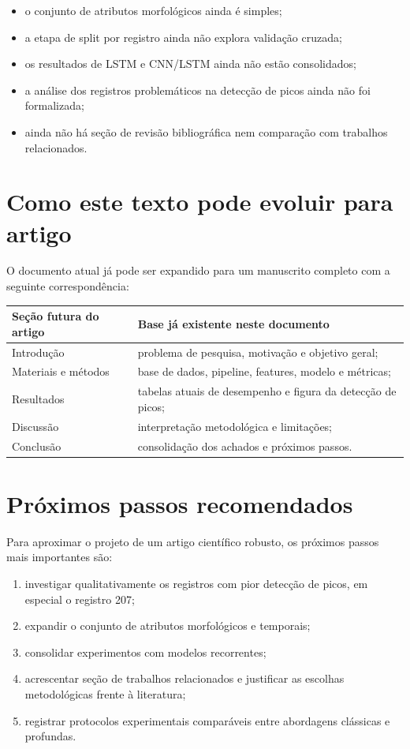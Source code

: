 \documentclass[12pt,a4paper]{article}
\begin{document}
\begin{itemize}
    \item o conjunto de atributos morfol\'ogicos ainda \'e simples;
    \item a etapa de split por registro ainda n\~ao explora valida\c{c}\~ao cruzada;
    \item os resultados de LSTM e CNN/LSTM ainda n\~ao est\~ao consolidados;
    \item a an\'alise dos registros problem\'aticos na detec\c{c}\~ao de picos ainda n\~ao foi formalizada;
    \item ainda n\~ao h\'a se\c{c}\~ao de revis\~ao bibliogr\'afica nem compara\c{c}\~ao com trabalhos relacionados.
\end{itemize}

\section{Como este texto pode evoluir para artigo}
O documento atual j\'a pode ser expandido para um manuscrito completo com a seguinte correspond\^encia:

\begin{longtable}{p{} p{}}
\toprule
\textbf{Se\c{c}\~ao futura do artigo} & \textbf{Base j\'a existente neste documento} \\
\midrule
Introdu\c{c}\~ao & problema de pesquisa, motiva\c{c}\~ao e objetivo geral; \\
Materiais e m\'etodos & base de dados, pipeline, features, modelo e m\'etricas; \\
Resultados & tabelas atuais de desempenho e figura da detec\c{c}\~ao de picos; \\
Discuss\~ao & interpreta\c{c}\~ao metodol\'ogica e limita\c{c}\~oes; \\
Conclus\~ao & consolida\c{c}\~ao dos achados e pr\'oximos passos. \\
\bottomrule
\end{longtable}

\section{Pr\'oximos passos recomendados}
Para aproximar o projeto de um artigo cient\'ifico robusto, os pr\'oximos passos mais importantes s\~ao:

\begin{enumerate}[label=\arabic*.]
    \item investigar qualitativamente os registros com pior detec\c{c}\~ao de picos, em especial o registro 207;
    \item expandir o conjunto de atributos morfol\'ogicos e temporais;
    \item consolidar experimentos com modelos recorrentes;
    \item acrescentar se\c{c}\~ao de trabalhos relacionados e justificar as escolhas metodol\'ogicas frente \`a literatura;
    \item registrar protocolos experimentais compar\'aveis entre abordagens cl\'assicas e profundas.
\end{enumerate}
\end{document}
